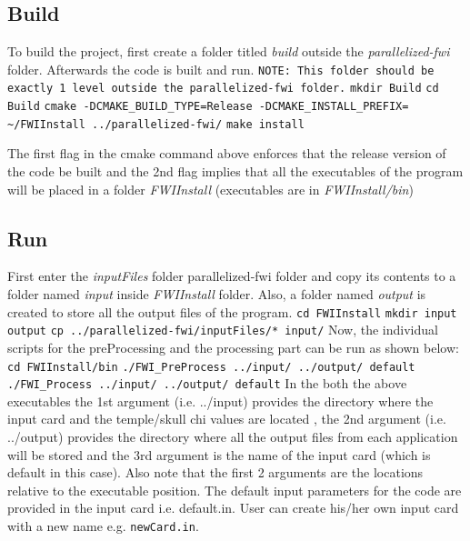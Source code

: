 \documentclass[10pt]{article}
\begin{document}
\subsection{Build}
To build the project, first create a folder titled \textit{build} outside the \textit{parallelized-fwi} folder. Afterwards the code is built and run. 
\newline
\texttt{NOTE: This folder should be exactly 1 level outside the parallelized-fwi folder.}
\newline
\texttt{mkdir Build}
\newline
\texttt{cd Build}
\newline
\texttt{cmake -DCMAKE\_BUILD\_TYPE=Release -DCMAKE\_INSTALL\_PREFIX= \textasciitilde/FWIInstall ../parallelized-fwi/}
\newline
\texttt{make install} 
\newline

\noindent The first flag in the cmake command above enforces that the release version of the code be built and the 2nd flag implies that all the executables of the program will be placed in a folder \textit{FWIInstall} (executables are in \textit{FWIInstall/bin})

\subsection{Run}
First enter the \textit{inputFiles} folder parallelized-fwi folder and copy its contents to a folder named \textit{input} inside \textit{FWIInstall} folder. Also, a folder named \textit{output} is created to store all the output files of the program.
\newline
\texttt{cd FWIInstall}
\newline
\texttt{mkdir input output}
\newline
\texttt{cp ../parallelized-fwi/inputFiles/* input/} 
\newline
Now, the individual scripts for the preProcessing and the processing part can be run as shown below:
\newline
\texttt{cd FWIInstall/bin}
\newline
\texttt{./FWI\_PreProcess ../input/ ../output/ default}
\newline
\texttt{./FWI\_Process ../input/ ../output/ default}
\newline
\noindent In the both the above executables the 1st argument (i.e. ../input) provides the directory where the input card and the temple/skull chi values are located , the 2nd argument (i.e. ../output) provides the directory where all the output files from each application will be stored and the 3rd argument is the name of the input card (which is default in this case). Also note that the first 2 arguments are the locations relative to the executable position. The default input parameters for the code are provided in the input card i.e. default.in. User can create his/her own input card with a new name e.g. \texttt{newCard.in}.
\end{document}

